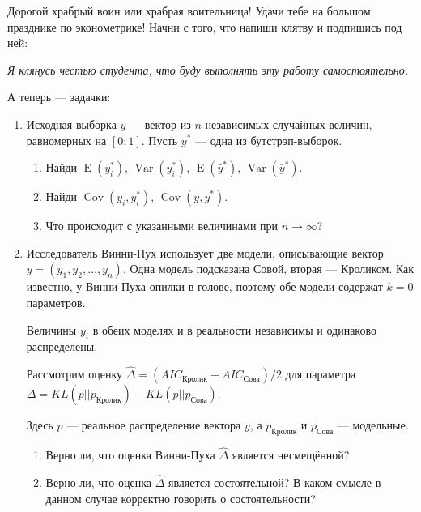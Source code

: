 \documentclass[12pt]{article} %
\theoremstyle{definition} %
\DeclareMathOperator{\Cov}{Cov}
\DeclareMathOperator{\Var}{Var}
\DeclareMathOperator{\E}{E}
\begin{document}
Дорогой храбрый воин или храбрая воительница! Удачи тебе на большом празднике по эконометрике!
Начни с того, что напиши клятву и подпишись под ней:

\vspace{10pt}
\textit{Я клянусь честью студента, что буду выполнять эту работу самостоятельно.}
\vspace{10pt}


А теперь — задачки:


\begin{enumerate}
 \item Исходная выборка $y$ — вектор из $n$ независимых случайных величин, 
равномерных на $[0;1]$. Пусть $y^*$ — одна из бутстрэп-выборок.

  \begin{enumerate}
    \item Найди $\E(y^*_i)$, $\Var(y^*_i)$, $\E(\bar y^*)$, $\Var(\bar y^*)$.
    \item Найди $\Cov(y_i, y_i^*)$, $\Cov(\bar y, \bar y^*)$.
    \item Что происходит с указанными величинами при $n\to\infty$?
  \end{enumerate}


\item Исследователь Винни-Пух использует две модели, описывающие вектор $y=(y_1, y_2, \ldots, y_n)$. 
Одна модель подсказана Совой, вторая — Кроликом. 
Как известно, у Винни-Пуха опилки в голове, поэтому обе модели содержат $k=0$ параметров.

Величины $y_i$ в обеих моделях и в реальности независимы и одинаково распределены.

Рассмотрим оценку $\hat \Delta = (AIC_{\text{Кролик}} - AIC_{\text{Сова}})/2$ для параметра $\Delta = KL(p||p_{\text{Кролик}}) - KL(p||p_{\text{Сова}})$.

Здесь $p$ — реальное распределение вектора $y$, а $p_{\text{Кролик}}$ и $p_{\text{Сова}}$ — модельные.

\begin{enumerate}
    \item Верно ли, что оценка Винни-Пуха $\hat \Delta$ является несмещённой?
    \item Верно ли, что оценка $\hat \Delta$ является состоятельной? В каком смысле в данном случае корректно говорить о состоятельности?
\end{enumerate}


\end{enumerate}
\end{document}

